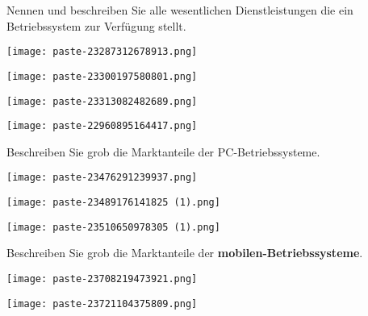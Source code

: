 \documentclass{article}
\begin{document}
\begin{tcolorbox}[colback=white!10!white,colframe=lightgray!75!black,
  savelowerto=\jobname_ex.tex,breakable,enhanced,lines before break=40]

\justifying
Nennen und beschreiben Sie alle wesentlichen Dienstleistungen die ein Betriebssystem zur Verfügung stellt.

\tcblower

\justifying
\begin{center}
\texttt{[image: paste-23287312678913.png]}
\end{center}
\begin{center}
\texttt{[image: paste-23300197580801.png]}
\end{center}
\begin{center}
\texttt{[image: paste-23313082482689.png]}
\end{center}
\begin{center}
\texttt{[image: paste-22960895164417.png]}
\end{center}

\end{tcolorbox}
\begin{tcolorbox}[colback=white!10!white,colframe=lightgray!75!black,
  savelowerto=\jobname_ex.tex,breakable,enhanced,lines before break=40]

\justifying
Beschreiben Sie grob die Marktanteile der PC-Betriebssysteme.

\tcblower

\justifying
\begin{center}
\texttt{[image: paste-23476291239937.png]}
\end{center}
\begin{center}
\texttt{[image: paste-23489176141825 (1).png]}
\end{center}
\begin{center}
\texttt{[image: paste-23510650978305 (1).png]}
\end{center}

\end{tcolorbox}
\begin{tcolorbox}[colback=white!10!white,colframe=lightgray!75!black,
  savelowerto=\jobname_ex.tex,breakable,enhanced,lines before break=40]

\justifying
Beschreiben Sie grob die Marktanteile der \textbf{mobilen-Betriebssysteme}.

\tcblower

\justifying
\begin{center}
\texttt{[image: paste-23708219473921.png]}
\end{center}
\begin{center}
\texttt{[image: paste-23721104375809.png]}
\end{center}

\end{tcolorbox}
\end{document}
